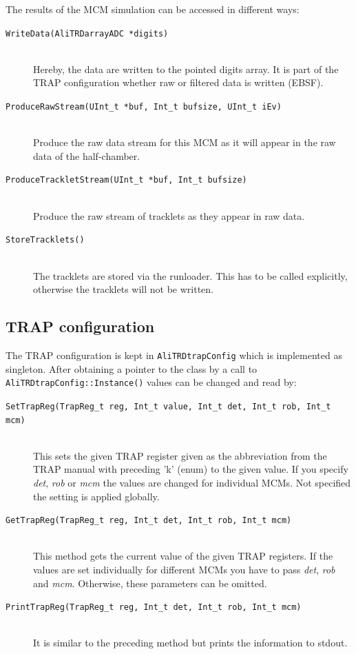 \documentclass{alicetdr}
\begin{document}
The results of the MCM simulation can be accessed in different ways:
\begin{description}
\item[{\tt WriteData(AliTRDarrayADC *digits)}] ~\\ Hereby, the data are
  written to the pointed digits array. It is part of the TRAP
  configuration whether raw or filtered data is written (EBSF). 
\item[{\tt ProduceRawStream(UInt\_t *buf, Int\_t bufsize, UInt\_t
    iEv)}] ~\\ Produce the raw data stream for this MCM as it will
  appear in the raw data of the half-chamber. 
\item[{\tt ProduceTrackletStream(UInt\_t *buf, Int\_t bufsize)}] ~\\
  Produce the raw stream of tracklets as they appear in raw data. 
\item[{\tt StoreTracklets()}] ~\\ The tracklets are stored via the
  runloader. This has to be called explicitly, otherwise the tracklets
  will not be written. 
\end{description}

\subsection{TRAP configuration} 
\label{sec:trapcfg}
The TRAP configuration is kept in {\tt AliTRDtrapConfig} which is
implemented as singleton. After obtaining a pointer to the class by a
call to {\tt AliTRDtrapConfig::Instance()} values can be changed and read by:
\begin{description}
\item[{\tt SetTrapReg(TrapReg\_t reg, Int\_t value, Int\_t det, Int\_t rob,
  Int\_t mcm)}] ~\\ This sets the given TRAP register given as the
  abbreviation from the TRAP manual with preceding 'k' (enum) to the
  given value. If you specify {\it det}, {\it rob} or {\it mcm} the
  values are changed for individual MCMs. Not specified the setting is
  applied globally. 
\item[{\tt GetTrapReg(TrapReg\_t reg, Int\_t det, Int\_t rob, Int\_t mcm)}]
  ~\\ This method gets the current value of the given TRAP
  registers. If the values are set individually for different MCMs you
  have to pass {\it det}, {\it rob} and {\it mcm}. Otherwise, these
  parameters can be omitted. 
\item[{\tt PrintTrapReg(TrapReg\_t reg, Int\_t det, Int\_t rob, Int\_t mcm)}]
  ~\\ It is similar to the preceding method but prints the information
  to stdout. 
\end{description}
\end{document}
